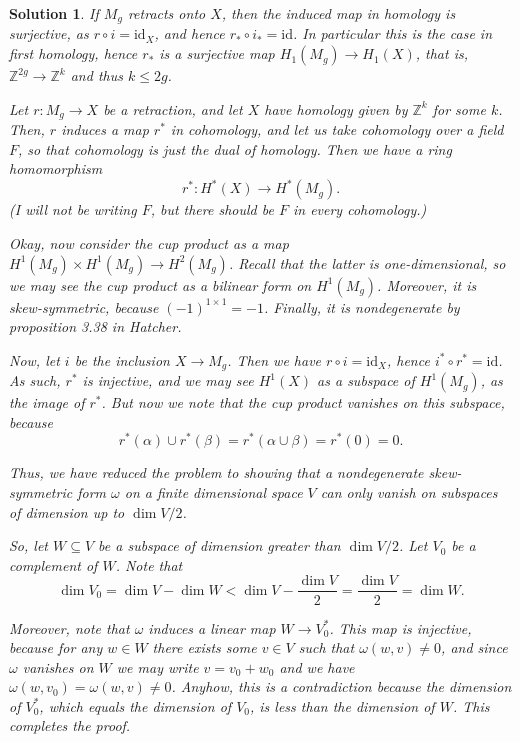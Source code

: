\documentclass{article}
\theoremstyle{plain}
\theoremstyle{nonumberplain}
\newtheorem{sol}{Solution}
\newcommand{\Z}{\mathbb{Z}}
\newcommand{\id}{\mathrm{id}}
\begin{document}
\begin{sol}
If $M_g$ retracts onto $X$, then the induced map in homology is surjective, as $r \circ i = \id_X$, and hence $r_* \circ i_* = \id$. In particular this is the case in first homology, hence $r_*$ is a surjective map $H_1(M_g) \to H_1(X)$, that is, $\Z^{2g} \to \Z^k$ and thus $k \leq 2g$.

Let $r \colon M_g \to X$ be a retraction, and let $X$ have homology given by $\Z^k$ for some $k$. Then, $r$ induces a map $r^*$ in cohomology, and let us take cohomology over a field $F$, so that cohomology is just the dual of homology. Then we have a ring homomorphism
\begin{equation}
r^* \colon H^*(X) \to H^*(M_g).
\end{equation}
(I will not be writing $F$, but there should be $F$ in every cohomology.)

Okay, now consider the cup product as a map $H^1(M_g) \times H^1(M_g) \to H^2(M_g)$. Recall that the latter is one-dimensional, so we may see the cup product as a bilinear form on $H^1(M_g)$. Moreover, it is skew-symmetric, because $(-1)^{1 \times 1} = -1$. Finally, it is nondegenerate by proposition 3.38 in Hatcher.

Now, let $i$ be the inclusion $X \to M_g$. Then we have $r \circ i = \id_X$, hence $i^* \circ r^* = \id$. As such, $r^*$ is injective, and we may see $H^1(X)$ as a subspace of $H^1(M_g)$, as the image of $r^*$. But now we note that the cup product vanishes on this subspace, because
\begin{equation}
r^*(\alpha) \cup r^*(\beta) = r^*(\alpha \cup \beta) = r^*(0) = 0.
\end{equation}

Thus, we have reduced the problem to showing that a nondegenerate skew-symmetric form $\omega$ on a finite dimensional space $V$ can only vanish on subspaces of dimension up to $\dim V / 2$.

So, let $W \subseteq V$ be a subspace of dimension greater than $\dim V / 2$. Let $V_0$ be a complement of $W$. Note that
\begin{equation}
\dim V_0 = \dim V - \dim W < \dim V - \frac{\dim V}2 = \frac{\dim V}2 = \dim W.
\end{equation}

Moreover, note that $\omega$ induces a linear map $W \to V_0^*$. This map is injective, because for any $w \in W$ there exists some $v \in V$ such that $\omega(w,v) \neq 0$, and since $\omega$ vanishes on $W$ we may write $v = v_0 + w_0$ and we have $\omega(w,v_0) = \omega(w,v) \neq 0$. Anyhow, this is a contradiction because the dimension of $V_0^*$, which equals the dimension of $V_0$, is less than the dimension of $W$. This completes the proof.


\end{sol}
\end{document}
